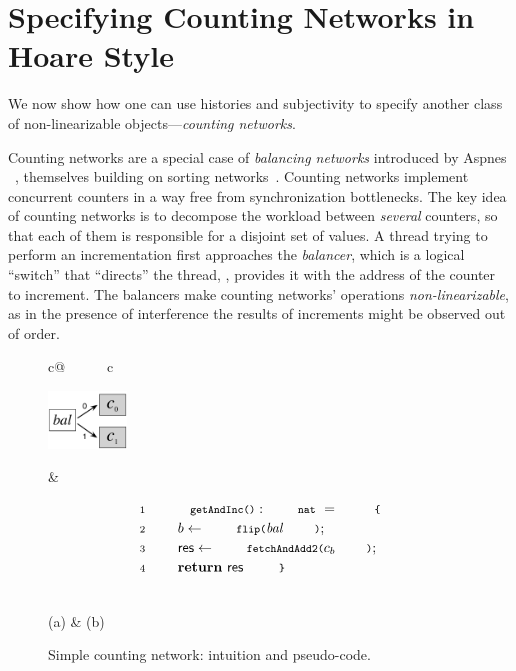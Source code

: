\section{Specifying Counting Networks in Hoare Style}
\label{sec:counting}

We now show how one can use histories and subjectivity to specify
another class of non-linearizable objects---\emph{counting networks}.

Counting networks are a special case of \emph{balancing networks}
introduced by Aspnes \etal~\cite{Aspnes-al:JACM94}, themselves
building on sorting networks~\cite{Ajtai-al:STOC83}. Counting networks
implement concurrent counters in a way free from synchronization
bottlenecks.
%
The key idea of counting networks is to decompose the workload between
\emph{several} counters, so that each of them is responsible for a
disjoint set of values. A thread trying to perform an incrementation
first approaches the \emph{balancer}, which is a logical ``switch''
that ``directs'' the thread, \ie, provides it with the address of the
counter to increment.
%
The balancers make counting networks' operations
\emph{non-linearizable}, as in the presence of interference the
results of increments might be observed out of order.
%

\begin{figure}%
\begin{tabular}{c@{\ \ \ \ \ \ }c}
\begin{minipage}[c]{2.5cm}
\includegraphics[width=2.1cm]{counter.pdf} 
\end{minipage}
&
\begin{minipage}[l]{4.9cm}
\centering
{\small{
\[
\begin{array}{rl}
\Num{1} & \esc{getAndInc()} : \esc{nat}~=~\esc{\{}  \\[2pt] 
\Num{2} & ~~~~ b \Asgn \esc{flip(}\bal\esc{)};\\[2pt]
\Num{3} & ~~~~ \res \Asgn \esc{fetchAndAdd2(}c_b\esc{)};\\[2pt]
\Num{4} & ~~~~ \kw{return}~\res~\esc{\}}
\end{array}
\]
}}
\end{minipage} 
\\
(a) & (b)
%
\end{tabular}
%
\caption{Simple counting network: intuition and pseudo-code.}
\label{fig:counter-fig} 
\end{figure}

